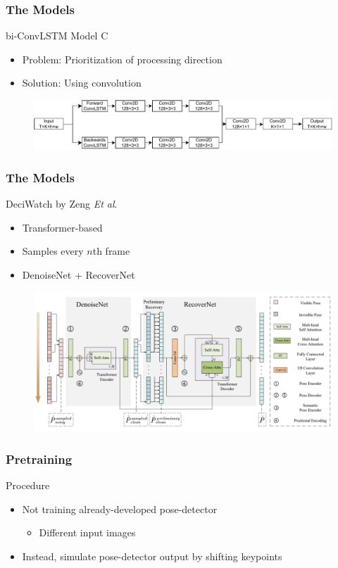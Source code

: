 \documentclass{beamer}
\begin{document}
\begin{frame}
    \frametitle{The Models}
    bi-ConvLSTM Model C
    \begin{itemize}
        \item<1-> Problem: Prioritization of processing direction
        \item<1-> Solution: Using convolution
    \end{itemize}
    \begin{figure}
        \centering
        \includegraphics[width = \textwidth]{../report/entities/unipose2.pdf}
    \end{figure}
\end{frame}

\begin{frame}
    \frametitle{The Models}
    DeciWatch by Zeng \textit{Et al}.
    \begin{itemize}
        \item<1-> Transformer-based
        \item<1-> Samples every $n$th frame
        \item<1-> DenoiseNet + RecoverNet
    \end{itemize}
    \begin{figure}
        \centering
        \includegraphics[width = \textwidth]{../report/entities/deciwatch.PNG}
    \end{figure}
\end{frame}

\begin{frame}
    \frametitle{Pretraining}
    Procedure
    \begin{itemize}
        \item<1-> Not training already-developed pose-detector
        \begin{itemize}
            \item Different input images
        \end{itemize}
        \item<2-> Instead, simulate pose-detector output by shifting keypoints
    \end{itemize}
\end{frame}
\end{document}
